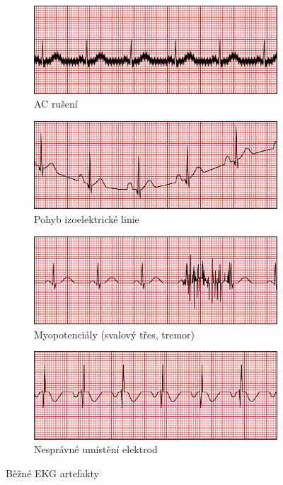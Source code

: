 \begin{figure}[h]
	\begin{subfigure}[b]{0.5\linewidth}
		\centering
		\includegraphics[width=0.8\linewidth]{../assets/ecg/ac_Interference}
		\caption{AC rušení}
		\label{fig:ac_Interference}
		\vspace{4ex}
	\end{subfigure}
	\begin{subfigure}[b]{0.5\linewidth}
		\centering
		\includegraphics[width=0.8\linewidth]{../assets/ecg/w_baseline}
		\caption{Pohyb izoelektrické linie}
		\label{fig:w_baseline}
		\vspace{4ex}
	\end{subfigure}
	\begin{subfigure}[b]{0.5\linewidth}
		\centering
		\includegraphics[width=0.8\linewidth]{../assets/ecg/muscle_tremor}
		\caption{Myopotenciály (svalový třes, tremor)}
		\label{fig:muscle_tremor}
	\end{subfigure}
	\begin{subfigure}[b]{0.5\linewidth}
		\centering
		\includegraphics[width=0.8\linewidth]{../assets/ecg/rev_electrodes}
		\caption{Nesprávné umístění elektrod}
		\label{fig:rev_electrodes}
	\end{subfigure}
	\caption{Běžné EKG artefakty \cite{Mauvila2004}}
	\label{fig:common_artifacts}
\end{figure}

